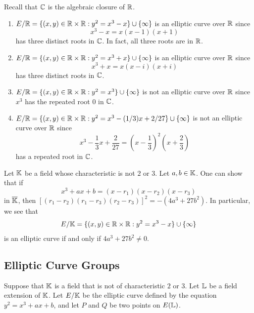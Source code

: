 \begin{exmp}
    Recall that $\mathbb{C}$ is the algebraic closure of $\mathbb{R}$. 
    \begin{enumerate}[(1)]
        \item $E/\mathbb{R} = \{(x, y) \in \mathbb{R} \times \mathbb{R} : y^2 = x^3 - x\} \cup \{\infty\}$
        is an elliptic curve over $\mathbb{R}$ since 
        \[ x^3 - x = x(x-1)(x+1) \] 
        has three distinct roots in $\mathbb{C}$. In fact, all three roots are in $\mathbb{R}$. 
        \item $E/\mathbb{R} = \{(x, y) \in \mathbb{R} \times \mathbb{R} : y^2 = x^3 + x\} \cup \{\infty\}$
        is an elliptic curve over $\mathbb{R}$ since
        \[ x^3 + x = x(x-i)(x+i) \] 
        has three distinct roots in $\mathbb{C}$. 
        \item $E/\mathbb{R} = \{(x, y) \in \mathbb{R} \times \mathbb{R} : y^2 = x^3\} \cup \{\infty\}$
        is not an elliptic curve over $\mathbb{R}$ since $x^3$ has the repeated root 
        $0$ in $\mathbb{C}$. 
        \item $E/\mathbb{R} = \{(x, y) \in \mathbb{R} \times \mathbb{R} : y^2 = x^3 - (1/3)x + 
        2/27\} \cup \{\infty\}$ is not an elliptic curve over $\mathbb{R}$ since 
        \[ x^3 - \frac13x + \frac{2}{27} = \left(x - \frac13\right)^{\!2}\left(x + \frac23\right) \] 
        has a repeated root in $\mathbb{C}$.
    \end{enumerate}
\end{exmp}

\begin{remark}
    Let $\mathbb{K}$ be a field whose characteristic is not $2$ or $3$. Let 
    $a, b \in \mathbb{K}$. One can show that if 
    \[ x^3 + ax + b = (x - r_1)(x - r_2)(x - r_3) \] 
    in $\overline{\mathbb{K}}$, then $[(r_1 - r_2)(r_1 - r_3)(r_2 - r_3)]^2 = -(4a^3 + 27b^2)$. 
    In particular, we see that 
    \[ E/\mathbb{K} = \{(x, y) \in \mathbb{R} \times \mathbb{R} : y^2 = x^3 - x\} \cup \{\infty\} \] 
    is an elliptic curve if and only if $4a^3 + 27b^2 \neq 0$. 
\end{remark}

\subsection{Elliptic Curve Groups}
Suppose that $\mathbb{K}$ is a field that is not of characteristic $2$ or $3$. 
Let $\mathbb{L}$ be a field extension of $\mathbb{K}$. Let $E/\mathbb{K}$ be the elliptic curve 
defined by the equation $y^2 = x^3 + ax + b$, and let $P$ and $Q$ be 
two points on $E(\mathbb{L})$. 

